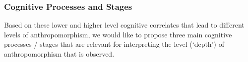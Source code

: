 \documentclass{frontiersSCNS} %
\begin{document}
\subsubsection{Cognitive Processes and Stages\\}

Based on these lower and higher level cognitive correlates that lead to different levels of anthropomorphism, we would like to propose three main cognitive processes / stages that are relevant for interpreting the level (`depth') of anthropomorphism that is observed.

\end{document}
